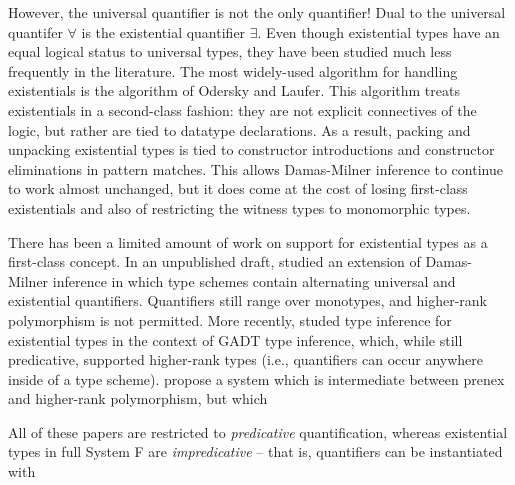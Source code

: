 However, the universal quantifier is not the only quantifier! Dual to the universal quantifer $\forall$ is the existential quantifier $\exists$. Even though existential types have an equal logical status to universal types, they have been studied much less frequently in the literature. The most widely-used algorithm for handling existentials is the algorithm of Odersky and Laufer. This algorithm treats existentials in a second-class fashion: they are not explicit connectives of the logic, but rather are tied to datatype declarations. As a result, packing and unpacking existential types is tied to constructor introductions and constructor eliminations in pattern matches. This allows Damas-Milner inference to continue to work almost unchanged, but it does come at the cost of losing first-class existentials and also of restricting the witness types to monomorphic types.

There has been a limited amount of work on support for existential types as a first-class concept. In an unpublished draft, \citet{leijen06} studied an extension of Damas-Milner inference in which type schemes contain alternating universal and existential quantifiers. Quantifiers still range over monotypes, and higher-rank polymorphism is not permitted. More recently, \citet{dk19} studed type inference for existential types in the context of GADT type inference, which, while still predicative, supported higher-rank types (i.e., quantifiers can occur anywhere inside of a type scheme). \citet{existential-crisis} propose a system which is intermediate between prenex and higher-rank polymorphism, but which 

All of these papers are restricted to \emph{predicative} quantification, whereas existential types in full System F are \emph{impredicative} -- that is, quantifiers can be instantiated with 



